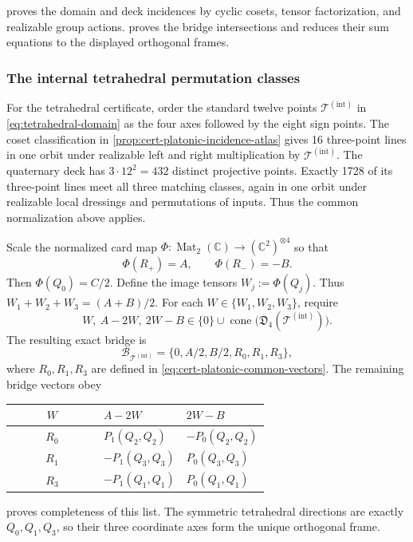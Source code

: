 \documentclass[11pt,letterpaper,onecolumn]{article}
\theoremstyle{plain}
\theoremstyle{definition}
\theoremstyle{remark}
\newcommand{\TetInt}{{\mathcal T^{(\mathrm{int})}}}
\newcommand{\Mat}{\operatorname{Mat}}
\begin{document}
 proves the domain and deck
incidences by cyclic cosets, tensor factorization, and realizable group actions.
 proves the bridge intersections and
reduces their sum equations to the displayed orthogonal frames.

\subsubsection{The internal tetrahedral permutation classes}
\label{proofsubsec:cert-A4}

For the tetrahedral certificate, order the standard twelve points
\(\TetInt\) in \cref{eq:tetrahedral-domain} as the four axes
followed by the eight sign points.  The coset classification in \cref{prop:cert-platonic-incidence-atlas}
gives 16 three-point lines in one orbit under realizable left and right multiplication by \(\TetInt\).  The quaternary
deck has \(3\cdot12^2=432\) distinct projective points.  Exactly 1728 of
its three-point lines meet all three matching classes, again in one orbit
under realizable local dressings and permutations of inputs.  Thus the common
normalization above applies.

Scale the normalized card map
\(\Phi:\Mat_2(\mathbb C)\to(\mathbb C^2)^{\otimes4}\)
so that
\[
 \Phi(R_+)=A,
 \qquad
 \Phi(R_-)=-B.
\]
Then \(\Phi(Q_0)=C/2\). Define the image tensors \(W_j:=\Phi(Q_j)\).  Thus
\(W_1+W_2+W_3=(A+B)/2\).  For each
\(W\in\{W_1,W_2,W_3\}\), require
\[
 W,\ A-2W,\ 2W-B
 \in\{0\}\cup\operatorname{cone}\bigl(\mathfrak D_4(\TetInt)\bigr).
\]
The resulting exact bridge is
\begin{equation}
 \mathcal B_{\TetInt}=\{0,A/2,B/2,R_0,R_1,R_3\},
 \label{eq:cert-A4-bridge}
\end{equation}
where \(R_0,R_1,R_3\) are defined in
\cref{eq:cert-platonic-common-vectors}.
The remaining bridge vectors obey
\begin{center}
\normalsize
\begin{tabular}{cL{0.32\linewidth}L{0.32\linewidth}}
\toprule
\(W\)&\(A-2W\)&\(2W-B\)\\
\midrule
\(R_0\)&\(P_1(Q_2,Q_2)\)&\(-P_0(Q_2,Q_2)\)\\
\(R_1\)&\(-P_1(Q_3,Q_3)\)&\(P_0(Q_3,Q_3)\)\\
\(R_3\)&\(-P_1(Q_1,Q_1)\)&\(P_0(Q_1,Q_1)\)\\
\bottomrule
\end{tabular}
\end{center}
 proves completeness of this list.
The symmetric tetrahedral directions are exactly \(Q_0,Q_1,Q_3\), so
their three coordinate axes form the unique orthogonal frame.
\end{document}
